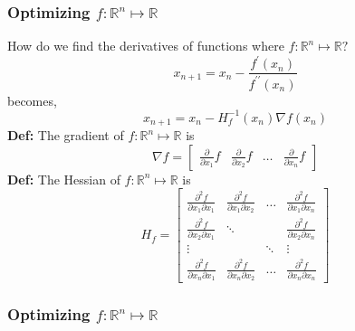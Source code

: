 \documentclass{beamer}
\newcommand{\RR}{\mathbb{R}}
\newcommand{\m}[1]{\begin{bmatrix} #1 \end{bmatrix}}
\newcommand{\pp}[2]{\frac{\partial^2 f}{\partial #1 \partial #2}}
\begin{document}
\begin{frame}
    \frametitle{Optimizing $f : \RR^n \mapsto \RR$}
    How do we find the derivatives of functions where $f : \RR^n \mapsto \RR?$
    \pause
    \[
        x_{n+1} = x_n - \frac{f^\prime(x_n)}{f^{\prime\prime}(x_n)}
    \]
    becomes,
    \[
        x_{n+1} = x_n - H_f^{-1}(x_n) \nabla f(x_n)
    \]
    \pause
    \textbf{Def:} The gradient of $f: \RR^n \mapsto \RR$ is
    \[
        \nabla f = \m{\frac{\partial}{\partial x_1}f & \frac{\partial}{\partial x_2}f & \dots & \frac{\partial}{\partial x_n}f}
    \]
    \pause
    \textbf{Def:} The Hessian of $f: \RR^n \mapsto \RR$ is
    \[
        H_f = \m{\pp{x_1}{x_1}&\pp{x_1}{x_2}&\dots&\pp{x_1}{x_n}\\
                 \pp{x_2}{x_1}&\ddots&&\pp{x_2}{x_n}\\
        \vdots&&\ddots&\vdots\\
                 \pp{x_n}{x_1}&\pp{x_n}{x_2}&\dots&\pp{x_n}{x_n}}
    \]
\end{frame}

\begin{frame}
    \frametitle{Optimizing $f : \RR^n \mapsto \RR$}
\end{frame}
\end{document}
